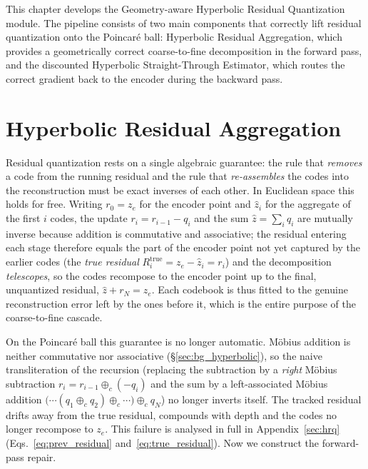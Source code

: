 \documentclass[12pt]{report}
\begin{document}
This chapter develops the Geometry-aware Hyperbolic Residual Quantization module. The pipeline consists of two main components that correctly lift residual quantization onto the Poincar\'e ball: Hyperbolic Residual Aggregation, which provides a geometrically correct coarse-to-fine decomposition in the forward pass, and the discounted Hyperbolic Straight-Through Estimator, which routes the correct gradient back to the encoder during the backward pass.

\section{Hyperbolic Residual Aggregation}
\label{sec:residagg}
\label{sec:newmethod}
Residual quantization rests on a single algebraic guarantee: the rule that \emph{removes} a code from the running residual and the rule that \emph{re-assembles} the codes into the reconstruction must be exact inverses of each other. In Euclidean space this holds for free. Writing $r_0=z_e$ for the encoder point and $\hat z_i$ for the aggregate of the first $i$ codes, the update $r_i=r_{i-1}-q_i$ and the sum $\hat z=\sum_i q_i$ are mutually inverse because addition is commutative and associative; the residual entering each stage therefore equals the part of the encoder point not yet captured by the earlier codes (the \emph{true residual} $R_i^{\text{true}}=z_e-\hat z_i=r_i$) and the decomposition \emph{telescopes}, so the codes recompose to the encoder point up to the final, unquantized residual, $\hat z+r_{N}=z_e$. Each codebook is thus fitted to the genuine reconstruction error left by the ones before it, which is the entire purpose of the coarse-to-fine cascade.

On the Poincar\'e ball this guarantee is no longer automatic. M\"obius addition is neither commutative nor associative (\S\ref{sec:bg_hyperbolic}), so the naive transliteration of the recursion (replacing the subtraction by a \emph{right} M\"obius subtraction $r_i=r_{i-1}\oplus_c(-q_i)$ and the sum by a left-associated M\"obius addition $\big(\cdots(q_1\oplus_c q_2)\oplus_c\cdots\big)\oplus_c q_{N}$) no longer inverts itself. The tracked residual drifts away from the true residual, compounds with depth and the codes no longer recompose to $z_e$. This failure is analysed in full in Appendix~\ref{sec:hrq} (Eqs.~\ref{eq:prev_residual} and~\ref{eq:true_residual}). Now we construct the forward-pass repair.
\end{document}
